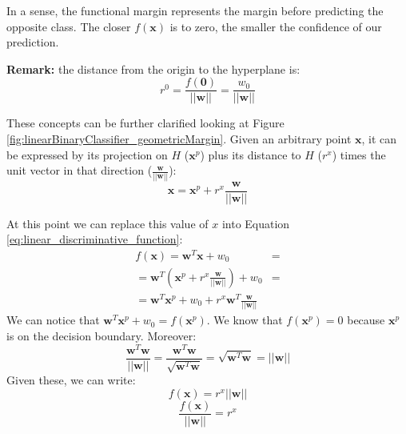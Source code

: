 
In a sense, the functional margin represents the margin before predicting the opposite class. The closer $f(\pmb{x})$ is to zero, the smaller the confidence of our prediction.


\textbf{Remark:} the distance from the origin to the hyperplane is:
\begin{equation}
    r^0 = \frac{f(\pmb{0})}{||\pmb{w}||} = \frac{w_0}{||\pmb{w}||}
\end{equation}

These concepts can be further clarified looking at Figure \ref{fig:linearBinaryClassifier_geometricMargin}. Given an arbitrary point $\pmb{x}$, it can be expressed by its projection on $H$ ($\pmb{x}^p$) plus its distance to $H$ ($r^x$) times the unit vector in that direction ($\frac{\pmb{w}}{||\pmb{w}||}$): $$\pmb{x} = \pmb{x}^p + r^x \frac{\pmb{w}}{||\pmb{w}||}$$

At this point we can replace this value of $x$ into Equation \ref{eq:linear_discriminative_function}:
\begin{align*}
    f(\pmb{x}) = \pmb{w}^T \pmb{x} + w_0 &=\\
    = \pmb{w}^T (\pmb{x}^p + r^x \frac{\pmb{w}}{||\pmb{w}||}) + w_0 &=\\
    = \pmb{w}^T \pmb{x}^p + w_0 + r^x \pmb{w}^T \frac{\pmb{w}}{||\pmb{w}||}
\end{align*}
We can notice that $\pmb{w}^T \pmb{x}^p + w_0 = f(\pmb{x}^p)$. We know that $f(\pmb{x}^p) = 0$ because $\pmb{x}^p$ is on the decision boundary. Moreover:
$$\frac{\pmb{w}^T \pmb{w}}{||\pmb{w}||} = \frac{\pmb{w}^T \pmb{w}}{\sqrt{\pmb{w}^T \pmb{w}}} = \sqrt{\pmb{w}^T \pmb{w}} = ||\pmb{w}||$$
Given these, we can write:
$$f(\pmb{x}) = r^x ||\pmb{w}||$$
$$\frac{f(\pmb{x})}{||\pmb{w}||} = r^x$$

